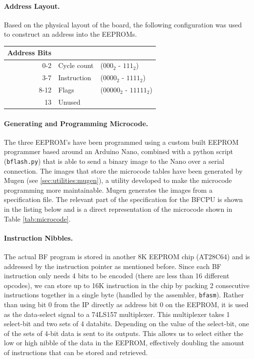 \paragraph{Address Layout.} Based on the physical layout of the board, the following configuration was used to construct an address into the EEPROMs.
\\
\begin{center}
\begin{tabular}{r|ll} 
  Address Bits & \\ \hline
  0-2  & Cycle count & ($000_2$ - $111_2$) \\
  3-7  & Instruction & ($0000_2$ - $1111_2$) \\
  8-12 & Flags  & ($00000_2$ - $11111_2$) \\
  13   & Unused & 
\end{tabular}
\end{center}


\paragraph{Generating and Programming Microcode.} The three EEPROM's have been programmed using a custom built EEPROM programmer based around an Arduino Nano, combined with a python script (\texttt{bflash.py}) that is able to send a binary image to the Nano over a serial connection. The images that store the microcode tables have been generated by Mugen (see \ref{sec:utilities:mugen}), a utility developed to make the microcode programming more maintainable. Mugen generates the images from a specification file. The relevant part of the specification for the BFCPU is shown in the listing below and is a direct representation of the microcode shown in Table \ref{tab:microcode}.




\paragraph{Instruction Nibbles.} The actual BF program is stored in another 8K EEPROM chip (AT28C64) and is addressed by the instruction pointer as mentioned before. Since each BF instruction only needs 4 bits to be encoded (there are less than 16 different opcodes), we can store up to 16K instruction in the chip by packing 2 consecutive instructions together in a single byte (handled by the assembler, \texttt{bfasm}). Rather than using bit 0 from the IP directly as address bit 0 on the EEPROM, it is used as the data-select signal to a 74LS157 multiplexer. This multiplexer takes 1 select-bit and two sets of 4 databits. Depending on the value of the select-bit, one of the sets of 4-bit data is sent to its outputs. This allows us to select either the low or high nibble of the data in the EEPROM, effectively doubling the amount of instructions that can be stored and retrieved.

